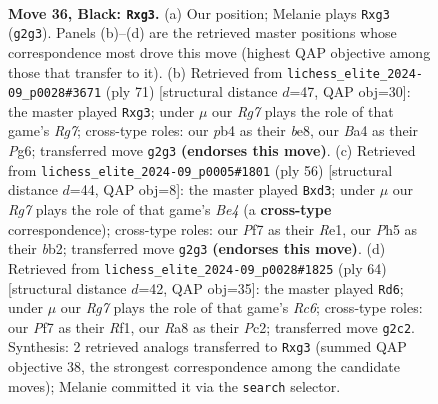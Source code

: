 \documentclass[11pt]{article}
\begin{document}
\clearpage

\begin{figure}[p]\centering
\begin{subfigure}{0.46\textwidth}\centering
\resizebox{\linewidth}{!}{%
\newchessgame
\chessboard[
  setfen={r7/pp3p2/5k2/7p/bP2P3/P5Pp/B5r1/R1R4K b - - 3 36},
  showmover=false,
  pgfstyle=straightmove, color=movearrow, markmove={g2-g3}
]}
\caption{}
\end{subfigure}\hfill
\begin{subfigure}{0.46\textwidth}\centering
\resizebox{\linewidth}{!}{%
\newchessgame
\chessboard[
  setfen={4Bk2/4Rp1p/3p2p1/3P4/5P2/2P3P1/5rr1/4R2K b - - 9 36},
  showmover=false,
  pgfstyle=straightmove, color=movearrow, markmove={g2-g3}
]}
\caption{}
\end{subfigure}
\\[4pt]
\begin{subfigure}{0.46\textwidth}\centering
\resizebox{\linewidth}{!}{%
\newchessgame
\chessboard[
  setfen={1r1r2k1/ppR5/7p/5PpP/4B3/PN1b4/1b3P2/4R1K1 w - - 0 29},
  showmover=false,
  pgfstyle=straightmove, color=movearrow, markmove={e4-d3}
]}
\caption{}
\end{subfigure}\hfill
\begin{subfigure}{0.46\textwidth}\centering
\resizebox{\linewidth}{!}{%
\newchessgame
\chessboard[
  setfen={4r3/pk2r3/1pR1b2p/8/1B2P2P/2P3p1/P1P3P1/2K2R2 w - - 1 33},
  showmover=false,
  pgfstyle=straightmove, color=movearrow, markmove={c6-d6}
]}
\caption{}
\end{subfigure}
\caption{\textbf{Move 36, Black: \texttt{Rxg3}.} (a) Our position; Melanie plays \texttt{Rxg3} (\texttt{g2g3}). Panels (b)--(d) are the retrieved master positions whose correspondence most drove this move (highest QAP objective among those that transfer to it). (b) Retrieved from \texttt{lichess\_elite\_2024-09\_p0028\#3671} (ply 71) [structural distance $d$=47, QAP obj=30]: the master played \texttt{Rxg3}; under $\mu$ our \emph{Rg7} plays the role of that game's \emph{Rg7}; cross-type roles: our \emph{p}b4 as their \emph{b}e8, our \emph{B}a4 as their \emph{P}g6; transferred move \texttt{g2g3} \textbf{(endorses this move)}. (c) Retrieved from \texttt{lichess\_elite\_2024-09\_p0005\#1801} (ply 56) [structural distance $d$=44, QAP obj=8]: the master played \texttt{Bxd3}; under $\mu$ our \emph{Rg7} plays the role of that game's \emph{Be4} (a \textbf{cross-type} correspondence); cross-type roles: our \emph{P}f7 as their \emph{R}e1, our \emph{P}h5 as their \emph{b}b2; transferred move \texttt{g2g3} \textbf{(endorses this move)}. (d) Retrieved from \texttt{lichess\_elite\_2024-09\_p0028\#1825} (ply 64) [structural distance $d$=42, QAP obj=35]: the master played \texttt{Rd6}; under $\mu$ our \emph{Rg7} plays the role of that game's \emph{Rc6}; cross-type roles: our \emph{P}f7 as their \emph{R}f1, our \emph{R}a8 as their \emph{P}c2; transferred move \texttt{g2c2}. Synthesis: 2 retrieved analogs transferred to \texttt{Rxg3} (summed QAP objective 38, the strongest correspondence among the candidate moves); Melanie committed it via the \texttt{search} selector.}
\label{fig:thought-m71}
\end{figure}
\end{document}
